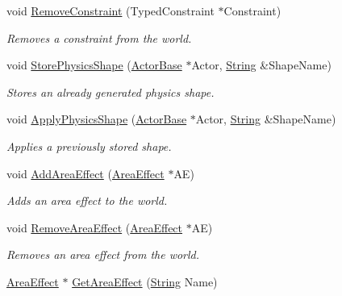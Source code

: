 \begin{DoxyCompactItemize}
void \hyperlink{classphys_1_1PhysicsManager_ace94aa20b5191b01630e7a5046cb7af6}{RemoveConstraint} (TypedConstraint $\ast$Constraint)
\begin{DoxyCompactList}\small\item\em Removes a constraint from the world. \item\end{DoxyCompactList}\item 
void \hyperlink{classphys_1_1PhysicsManager_a24fae734b5750db6fc1d2b1e3656bb71}{StorePhysicsShape} (\hyperlink{classphys_1_1ActorBase}{ActorBase} $\ast$Actor, \hyperlink{namespacephys_aa03900411993de7fbfec4789bc1d392e}{String} \&ShapeName)
\begin{DoxyCompactList}\small\item\em Stores an already generated physics shape. \item\end{DoxyCompactList}\item 
void \hyperlink{classphys_1_1PhysicsManager_a58653c59133900a432169a7c980105ce}{ApplyPhysicsShape} (\hyperlink{classphys_1_1ActorBase}{ActorBase} $\ast$Actor, \hyperlink{namespacephys_aa03900411993de7fbfec4789bc1d392e}{String} \&ShapeName)
\begin{DoxyCompactList}\small\item\em Applies a previously stored shape. \item\end{DoxyCompactList}\item 
void \hyperlink{classphys_1_1PhysicsManager_a64e75a71598b6440c4feb1a2214a1420}{AddAreaEffect} (\hyperlink{classphys_1_1AreaEffect}{AreaEffect} $\ast$AE)
\begin{DoxyCompactList}\small\item\em Adds an area effect to the world. \item\end{DoxyCompactList}\item 
void \hyperlink{classphys_1_1PhysicsManager_a5ee0f784a8239be56164a7a67a28f227}{RemoveAreaEffect} (\hyperlink{classphys_1_1AreaEffect}{AreaEffect} $\ast$AE)
\begin{DoxyCompactList}\small\item\em Removes an area effect from the world. \item\end{DoxyCompactList}\item 
\hyperlink{classphys_1_1AreaEffect}{AreaEffect} $\ast$ \hyperlink{classphys_1_1PhysicsManager_a36b575504b1de592ee24d08ebf1fd620}{GetAreaEffect} (\hyperlink{namespacephys_aa03900411993de7fbfec4789bc1d392e}{String} Name)

\end{DoxyCompactItemize}
